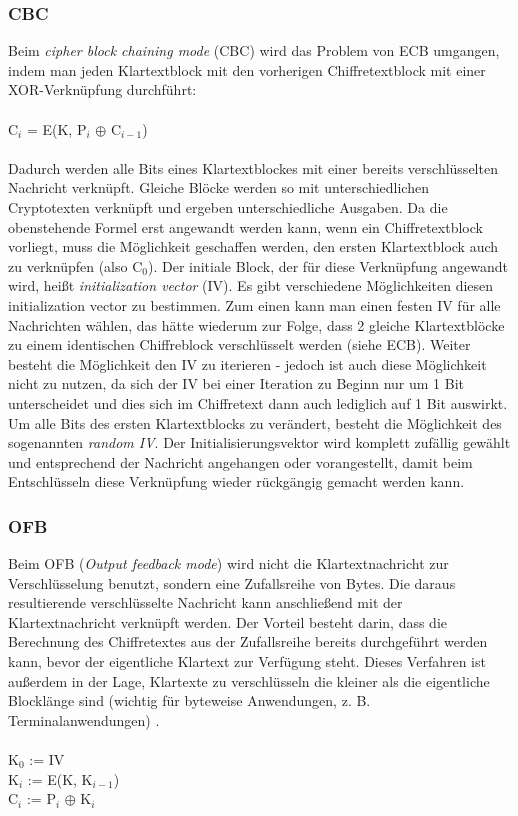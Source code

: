 \documentclass[10pt, a4paper,headsepline]{scrreprt}
\begin{document}
\subsubsection{CBC}
Beim \textit{cipher block chaining mode} (CBC) wird das Problem von ECB umgangen, indem man jeden Klartextblock mit den vorherigen Chiffretextblock mit einer XOR-Verknüpfung durchführt: \\ \\
C$_{i}$ = E(K, P$_{i}$ $\oplus$ C$_{i-1}$) \\ \\
Dadurch werden alle Bits eines Klartextblockes mit einer bereits verschlüsselten Nachricht verknüpft. Gleiche Blöcke werden so mit unterschiedlichen Cryptotexten verknüpft und ergeben unterschiedliche Ausgaben.
Da die obenstehende Formel erst angewandt werden kann, wenn ein Chiffretextblock vorliegt, muss die Möglichkeit geschaffen werden, den ersten Klartextblock auch zu verknüpfen (also C$_{0}$). Der initiale Block, der für diese Verknüpfung angewandt wird, heißt \textit{initialization vector} (IV).
Es gibt verschiedene Möglichkeiten diesen initialization vector zu bestimmen. Zum einen kann man einen festen IV für alle Nachrichten wählen, das hätte wiederum zur Folge, dass 2 gleiche Klartextblöcke zu einem identischen Chiffreblock verschlüsselt werden (siehe ECB). Weiter besteht die Möglichkeit den IV zu iterieren - jedoch ist auch diese Möglichkeit nicht zu nutzen, da sich der IV bei einer Iteration zu Beginn nur um 1 Bit unterscheidet und dies sich im Chiffretext dann auch lediglich auf 1 Bit auswirkt. Um alle Bits des ersten Klartextblocks zu verändert, besteht die Möglichkeit des sogenannten \textit{random IV}. Der Initialisierungsvektor wird komplett zufällig gewählt und entsprechend der Nachricht angehangen oder vorangestellt, damit beim Entschlüsseln diese Verknüpfung wieder rückgängig gemacht werden kann. \citep[S. 227ff]{book:angewandte-krypto}

\subsubsection{OFB}
Beim OFB (\textit{Output feedback mode}) wird nicht die Klartextnachricht zur Verschlüsselung benutzt, sondern eine Zufallsreihe von Bytes. Die daraus resultierende verschlüsselte Nachricht kann anschließend mit der Klartextnachricht verknüpft werden. Der Vorteil besteht darin, dass die Berechnung des Chiffretextes aus der Zufallsreihe bereits durchgeführt werden kann, bevor der eigentliche Klartext zur Verfügung steht. Dieses Verfahren ist außerdem in der Lage, Klartexte zu verschlüsseln die kleiner als die eigentliche Blocklänge sind (wichtig für byteweise Anwendungen, z. B. Terminalanwendungen) \citep[S. 240ff]{book:angewandte-krypto}. \\ \\
K$_{0}$ := IV \\
K$_{i}$ := E(K, K$_{i-1}$) \\
C$_{i}$ := P$_{i}$ $\oplus$ K$_{i}$ \\ \\
\end{document}

